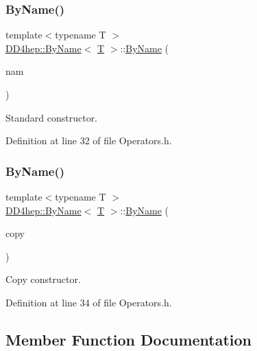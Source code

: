 \subsubsection{\texorpdfstring{By\+Name()}{ByName()}\hspace{0.1cm}{\footnotesize\ttfamily [1/2]}}
{\footnotesize\ttfamily template$<$typename T $>$ \\
\hyperlink{class_d_d4hep_1_1_by_name}{D\+D4hep\+::\+By\+Name}$<$ \hyperlink{class_t}{T} $>$\+::\hyperlink{class_d_d4hep_1_1_by_name}{By\+Name} (\begin{DoxyParamCaption}\item[{const std\+::string \&}]{nam }\end{DoxyParamCaption})\hspace{0.3cm}{\ttfamily [inline]}}



Standard constructor. 



Definition at line 32 of file Operators.\+h.

\hypertarget{class_d_d4hep_1_1_by_name_a09dee9528eddd3d93d3ab985717dc809}{}\label{class_d_d4hep_1_1_by_name_a09dee9528eddd3d93d3ab985717dc809} 
\subsubsection{\texorpdfstring{By\+Name()}{ByName()}\hspace{0.1cm}{\footnotesize\ttfamily [2/2]}}
{\footnotesize\ttfamily template$<$typename T $>$ \\
\hyperlink{class_d_d4hep_1_1_by_name}{D\+D4hep\+::\+By\+Name}$<$ \hyperlink{class_t}{T} $>$\+::\hyperlink{class_d_d4hep_1_1_by_name}{By\+Name} (\begin{DoxyParamCaption}\item[{const \hyperlink{class_d_d4hep_1_1_by_name}{By\+Name}$<$ \hyperlink{class_t}{T} $>$ \&}]{copy }\end{DoxyParamCaption})\hspace{0.3cm}{\ttfamily [inline]}}



Copy constructor. 



Definition at line 34 of file Operators.\+h.



\subsection{Member Function Documentation}
\hypertarget{class_d_d4hep_1_1_by_name_a31c19f8372a0ccacd0af0ee9c71e1a85}{}\label{class_d_d4hep_1_1_by_name_a31c19f8372a0ccacd0af0ee9c71e1a85} 
